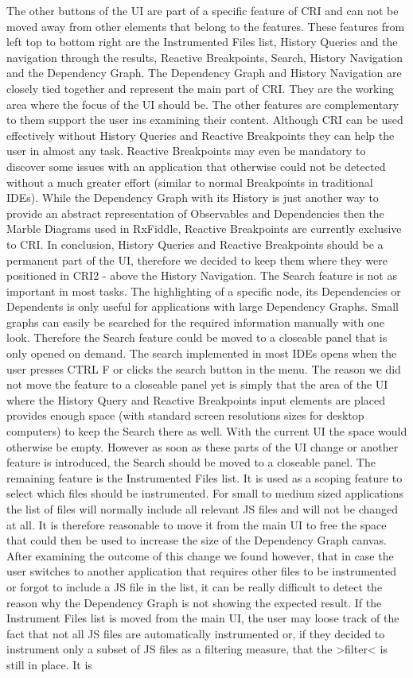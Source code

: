 The other buttons of the UI are part of a specific feature of CRI and can not be moved away from other elements that belong to the features. These features from left top to bottom right are the Instrumented Files list, History Queries and the navigation through the results, Reactive Breakpoints, Search, History Navigation and the Dependency Graph. The Dependency Graph and History Navigation are closely tied together and represent the main part of CRI. They are the working area where the focus of the UI should be. The other features are complementary to them support the user ins examining their content. Although CRI can be used effectively without History Queries and Reactive Breakpoints they can help the user in almost any task. Reactive Breakpoints may even be mandatory to discover some issues with an application that otherwise could not be detected without a much greater effort (similar to normal Breakpoints in traditional IDEs). While the Dependency Graph with its History is just another way to provide an abstract representation of Observables and Dependencies then the Marble Diagrams used in RxFiddle, Reactive Breakpoints are currently exclusive to CRI. In conclusion, History Queries and Reactive Breakpoints should be a permanent part of the UI, therefore we decided to keep them where they were positioned in CRI2 - above the History Navigation. The Search feature is not as important in most tasks. The highlighting of a specific node, its Dependencies or Dependents is only useful for applications with large Dependency Graphs. Small graphs can easily be searched for the required information manually with one look. Therefore the Search feature could be moved to a closeable panel that is only opened on demand. The search implemented in most IDEs opens when the user presses CTRL F or clicks the search button in the menu. The reason we did not move the feature to a closeable panel yet is simply that the area of the UI where the History Query and Reactive Breakpoints input elements are placed provides enough space (with standard screen resolutions sizes for desktop computers) to keep the Search there as well. With the current UI the space would otherwise be empty. However as soon as these parts of the UI change or another feature is introduced, the Search should be moved to a closeable panel. The remaining feature is the Instrumented Files list. It is used as a scoping feature to select which files should be instrumented. For small to medium sized applications the list of files will normally include all relevant JS files and will not be changed at all. It is therefore reasonable to move it from the main UI to free the space that could then be used to increase the size of the Dependency Graph canvas. After examining the outcome of this change we found however, that in case the user switches to another application that requires other files to be instrumented or forgot to include a JS file in the list, it can be really difficult to detect the reason why the Dependency Graph is not showing the expected result. If the Instrument Files list is moved from the main UI, the user may loose track of the fact that not all JS files are automatically instrumented or, if they decided to instrument only a subset of JS files as a filtering measure, that the >filter< is still in place. It is 